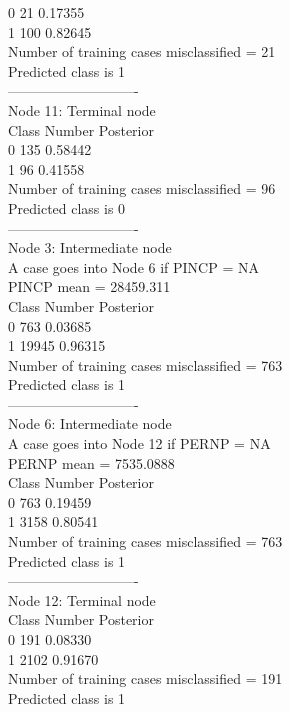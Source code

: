 \documentclass[12pt]{article}
\begin{document}
 0              21     0.17355\\
 1             100     0.82645\\
 Number of training cases misclassified = 21\\
 Predicted class is 1\\
 ----------------------------\\
Node 11: Terminal node\\
 Class      Number   Posterior\\
 0             135     0.58442\\
 1              96     0.41558\\
 Number of training cases misclassified = 96\\
 Predicted class is 0\\
 ----------------------------\\
Node 3: Intermediate node\\
 A case goes into Node 6 if PINCP = NA\\
 PINCP mean = 28459.311\\
 Class      Number   Posterior\\
 0             763     0.03685\\
 1           19945     0.96315\\
 Number of training cases misclassified = 763\\
 Predicted class is 1\\
 ----------------------------\\
Node 6: Intermediate node\\
 A case goes into Node 12 if PERNP = NA\\
 PERNP mean = 7535.0888\\
 Class      Number   Posterior\\
 0             763     0.19459\\
 1            3158     0.80541\\
 Number of training cases misclassified = 763\\
 Predicted class is 1\\
 ----------------------------\\
Node 12: Terminal node\\
 Class      Number   Posterior\\
 0             191     0.08330\\
 1            2102     0.91670\\
 Number of training cases misclassified = 191\\
 Predicted class is 1\\
\end{document}
